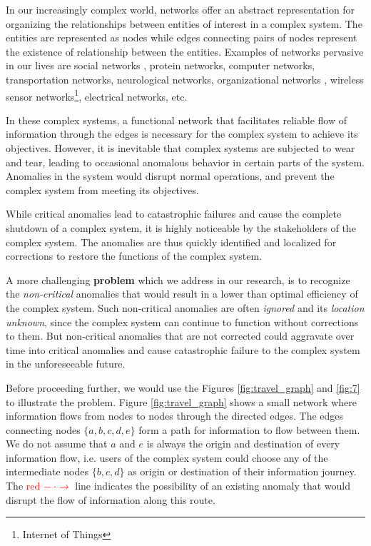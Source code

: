\documentclass{sig-alternate}
\begin{document}
In our increasingly complex world, networks offer an abstract representation for organizing the relationships between entities of interest in a complex system. The entities are represented as nodes while edges connecting pairs of nodes represent the existence of relationship between the entities. Examples of networks pervasive in our lives are social networks \cite{Wu2004}, protein networks, computer networks, transportation networks, neurological networks, organizational networks \cite{Mihm2010}, wireless sensor networks\footnote{Internet of Things}, electrical networks, etc. 

In these complex systems, a functional network that facilitates reliable flow of information through the edges is necessary for the complex system to achieve its objectives. However, it is inevitable that complex systems are subjected to wear and tear, leading to occasional anomalous behavior in certain parts of the system. Anomalies in the system would disrupt normal operations, and prevent the complex system from meeting its objectives.

While critical anomalies lead to catastrophic failures and cause the complete shutdown of a complex system, it is highly noticeable by the stakeholders of the complex system. The anomalies are thus quickly identified and localized for corrections to restore the functions of the complex system.

A more challenging \textbf{problem} which we address in our research, is to recognize the \emph{non-critical} anomalies that would result in a lower than optimal efficiency of the complex system. Such non-critical anomalies are often \emph{ignored} and its \emph{location unknown}, since the complex system can continue to function without corrections to them. But non-critical anomalies that are not corrected could aggravate over time into critical anomalies and cause catastrophic failure to the complex system in the unforeseeable future. 

Before proceeding further, we would use the Figures \ref{fig:travel_graph} and \ref{fig:7} to illustrate the problem. Figure \ref{fig:travel_graph} shows a small network where information flows from nodes to nodes through the directed edges. The edges connecting nodes $\{a, b, c, d, e\}$ form a path for information to flow between them. We do not assume that $a$ and $e$ is always the origin and destination of every information flow, i.e. users of the complex system could choose any of the intermediate nodes $\{b, c, d\}$ as origin or destination of their information journey. The \textcolor{red}{red $- ~ \cdot \rightarrow$} line indicates the possibility of an existing anomaly that would disrupt the flow of information along this route.
\end{document}
